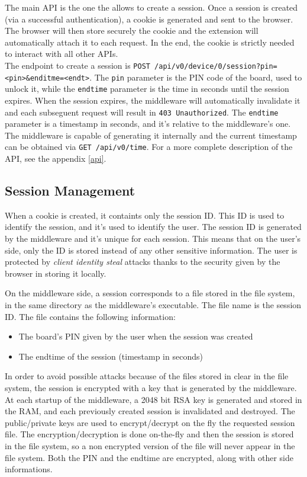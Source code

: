 The main API is the one the allows to create a session. Once a session is created (via a successful authentication), a cookie is generated and sent to the browser. The browser will then store securely the cookie and the extension will automatically attach it to each request. In the end, the cookie is strictly needed to interact with all other APIs.\\

The endpoint to create a session is \texttt{POST /api/v0/device/0/session?pin=<pin>\&enditme=<endt>}. The \texttt{pin} parameter is the PIN code of the board, used to unlock it, while the \texttt{endtime} parameter is the time in seconds until the session expires. When the session expires, the middleware will automatically invalidate it and each subseguent request will result in \texttt{403 Unauthorized}. The \texttt{endtime} parameter is a timestamp in seconds, and it's relative to the middleware's one. The middleware is capable of generating it internally and the current timestamp can be obtained via \texttt{GET /api/v0/time}. For a more complete description of the API, see the appendix \ref{api}.

\subsection{Session Management}
When a cookie is created, it containts only the session ID. This ID is used to identify the session, and it's used to identify the user. The session ID is generated by the middleware and it's unique for each session. This means that on the user's side, only the ID is stored instead of any other sensitive information. The user is protected by \textit{client identity steal} attacks thanks to the security given by the browser in storing it locally.

On the middleware side, a session corresponds to a file stored in the file system, in the same directory as the middleware's executable. The file name is the session ID. The file contains the following information:

\begin{itemize}
    \item The board's PIN given by the user when the session was created
    \item The endtime of the session (timestamp in seconds)
\end{itemize}

In order to avoid possible attacks because of the files stored in clear in the file system, the session is encrypted with a key that is generated by the middleware. At each startup of the middleware, a 2048 bit RSA key is generated and stored in the RAM, and each previously created session is invalidated and destroyed. The public/private keys are used to encrypt/decrypt on the fly the requested session file. The encryption/decryption is done on-the-fly and then the session is stored in the file system, so a non encrypted version of the file will never appear in the file system. Both the PIN and the endtime are encrypted, along with other side informations.

